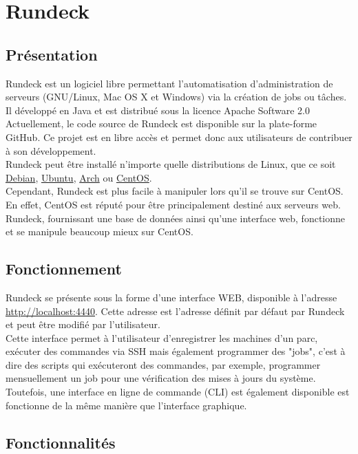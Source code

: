 \documentclass[11pt]{article}
\begin{document}
\section{Rundeck}

\subsection{Présentation}

Rundeck est un logiciel libre permettant l'automatisation d'administration de serveurs (GNU/Linux, Mac OS X et Windows) via la création de jobs ou tâches. Il développé en Java et est distribué sous la licence Apache Software 2.0
\\
Actuellement, le code source de Rundeck est disponible sur la plate-forme GitHub. Ce projet est en libre accès et permet donc aux utilisateurs de contribuer à son développement.
\\
Rundeck peut être installé n'importe quelle distributions de Linux, que ce soit \underline{Debian}, \underline{Ubuntu}, \underline{Arch} ou \underline{CentOS}. 
\\
Cependant, Rundeck est plus facile à manipuler lors qu'il se trouve sur CentOS. En effet, CentOS est réputé pour être principalement destiné aux serveurs web. Rundeck, fournissant une base de données ainsi qu'une interface web, fonctionne et se manipule beaucoup mieux sur CentOS.

\subsection{Fonctionnement}
Rundeck se présente sous la forme d'une interface WEB, disponible à l'adresse \underline{http://localhost:4440}. Cette adresse est l'adresse définit par défaut par Rundeck et peut être modifié par l'utilisateur.
\\
Cette interface permet à l'utilisateur d'enregistrer les machines d'un parc, exécuter des commandes via SSH mais également programmer des "jobs", c'est à dire des scripts qui exécuteront des commandes, par exemple, programmer mensuellement un job pour une vérification des mises à jours du système. 
\\
Toutefois, une interface en ligne de commande (CLI) est également disponible est fonctionne de la même manière que l'interface graphique.

\subsection{Fonctionnalités}
\end{document}
